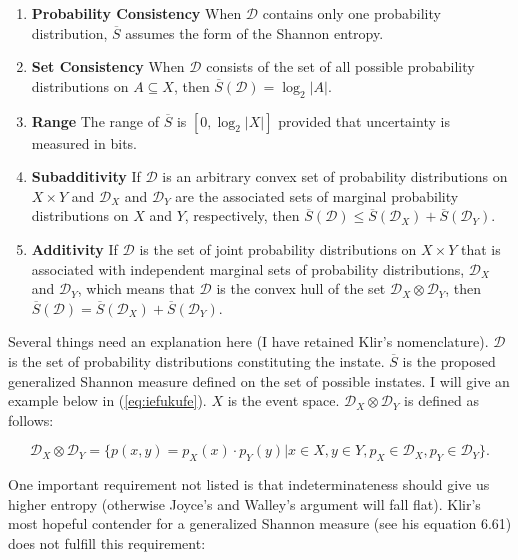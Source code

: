 \documentclass[11pt]{article}
\begin{document}
\begin{enumerate}[(S1)]
\item \textbf{Probability Consistency} When $\mathcal{D}$ contains
  only one probability distribution, $\overline{S}$ assumes the form of
  the Shannon entropy.
\item \textbf{Set Consistency} When $\mathcal{D}$ consists of the set
  of all possible probability distributions on $A\subseteq{}X$, then
  $\overline{S}(\mathcal{D})=\log_{2}|A|$.
\item \textbf{Range} The range of $\overline{S}$ is $[0,\log_{2}|X|]$
  provided that uncertainty is measured in bits.
\item \textbf{Subadditivity} If $\mathcal{D}$ is an arbitrary convex
  set of probability distributions on $X\times{}Y$ and
  $\mathcal{D}_{X}$ and $\mathcal{D}_{Y}$ are the associated sets of
  marginal probability distributions on $X$ and $Y$, respectively,
  then
  $\overline{S}(\mathcal{D})\leq\overline{S}(\mathcal{D}_{X})+\overline{S}(\mathcal{D}_{Y})$.
\item \textbf{Additivity} If $\mathcal{D}$ is the set of joint
  probability distributions on $X\times{}Y$ that is associated with
  independent marginal sets of probability distributions,
  $\mathcal{D}_{X}$ and $\mathcal{D}_{Y}$, which means that
  $\mathcal{D}$ is the convex hull of the set
  $\mathcal{D}_{X}\otimes\mathcal{D}_{Y}$, then
  $\overline{S}(\mathcal{D})=\overline{S}(\mathcal{D}_{X})+\overline{S}(\mathcal{D}_{Y})$.
\end{enumerate}

Several things need an explanation here (I have retained Klir's
nomenclature). $\mathcal{D}$ is the set of probability distributions
constituting the instate. $\overline{S}$ is the proposed generalized
Shannon measure defined on the set of possible instates. I will give
an example below in (\ref{eq:iefukufe}). $X$ is the event space.
$\mathcal{D}_{X}\otimes\mathcal{D}_{Y}$ is defined as follows:

\begin{equation}
  \label{eq:xoofahee}
\mathcal{D}_{X}\otimes\mathcal{D}_{Y}=\{p(x,y)=p_{X}(x)\cdot{}p_{Y}(y)|x\in{}X,y\in{}Y,p_{X}\in\mathcal{D}_{X},p_{Y}\in\mathcal{D}_{Y}\}.
\end{equation}

One important requirement not listed is that indeterminateness should
give us higher entropy (otherwise Joyce's and Walley's argument will
fall flat). Klir's most hopeful contender for a generalized Shannon
measure (see his equation 6.61) does not fulfill this requirement:
\end{document}
